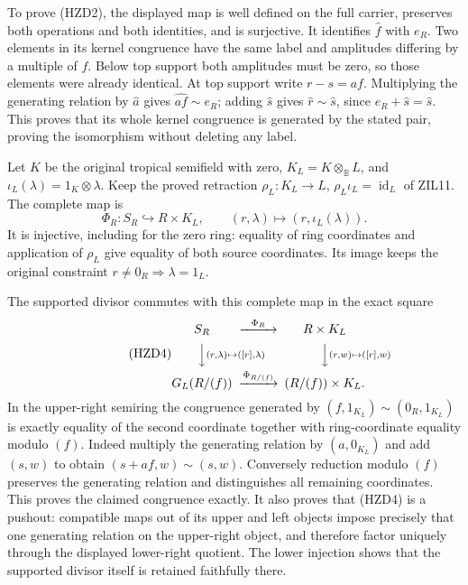 To prove (HZD2), the displayed map is well defined on the full carrier,
preserves both operations and both identities, and is surjective.
It identifies $\widehat f$ with $e_R$. Two elements in its kernel
congruence have the same label and amplitudes differing by a multiple
of $f$. Below top support both amplitudes must be zero, so those
elements were already identical. At top support write $r-s=af$.
Multiplying the generating relation by $\widehat a$ gives
$\widehat{af}\sim e_R$; adding $\widehat s$ gives
$\widehat r\sim\widehat s$, since $e_R+\widehat s=\widehat s$.
This proves that its whole kernel congruence is generated by the
stated pair, proving the isomorphism without deleting any label.

Let $K$ be the original tropical semifield with zero,
$K_L=K\otimes_{\mathbb B}L$, and
$\iota_L(\lambda)=1_K\otimes\lambda$. Keep the proved retraction
$\rho_L:K_L\to L$, $\rho_L\iota_L=\operatorname{id}_L$ of ZIL11.
The complete map is
\begin{equation}\tag{HZD3}
 \Phi_R:S_R\hookrightarrow R\times K_L,
       \qquad(r,\lambda)\longmapsto(r,\iota_L(\lambda)).
\end{equation}
It is injective, including for the zero ring: equality of ring
coordinates and application of $\rho_L$ give equality of both
source coordinates. Its image keeps the original constraint
$r\ne0_R\Rightarrow\lambda=1_L$.

The supported divisor commutes with this complete map in the exact
square
\begin{equation}\tag{HZD4}
\begin{CD}
 S_R @>{\Phi_R}>> R\times K_L\\
 @VV{(r,\lambda)\mapsto([r],\lambda)}V
 @VV{(r,w)\mapsto([r],w)}V\\
 G_L(R/(f)) @>{\Phi_{R/(f)}}>> (R/(f))\times K_L.
\end{CD}
\end{equation}
In the upper-right semiring the congruence generated by
$(f,1_{K_L})\sim(0_R,1_{K_L})$ is exactly equality of the second
coordinate together with ring-coordinate equality modulo $(f)$.
Indeed multiply the generating relation by $(a,0_{K_L})$ and add
$(s,w)$ to obtain $(s+af,w)\sim(s,w)$. Conversely reduction modulo
$(f)$ preserves the generating relation and distinguishes all remaining
coordinates. This proves the claimed congruence exactly. It also
proves that (HZD4) is a pushout: compatible maps out of its upper
and left objects impose precisely that one generating relation on
the upper-right object, and therefore factor uniquely through the
displayed lower-right quotient. The lower injection shows that the
supported divisor itself is retained faithfully there.

